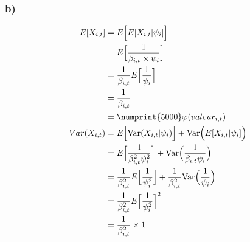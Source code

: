 \documentclass[11pt,french]{report}
\begin{document}
\subsubsection*{b)}
\begin{align*}
E[X_{i,t}] &= E \Big[E[X_{i,t}|\psi_i]  \Big] \\
&= E \Big[\frac{1}{\beta_{i,t} \times \psi_i} \Big] \\
&=\frac{1}{\beta_{i,t}} E \Big[\frac{1}{\psi_i} \Big] \\
&= \frac{1}{\beta_{i,t}}\\
&=\numprint{5000} \varphi(valeur_{i,t})\\                                                                                                                                                                                                     Var(X_{i,t}) &= E \Big[\text{Var}(X_{i,t}|\psi_i) \Big] + \text{Var}\Big( E[X_{i,t}|\psi_i]  \Big) \\
&= E \Big[\frac{1}{\beta_{i,t}^2 \psi_i^2}\Big] + \text{Var}\Big(\frac{1}{\beta_{i,t} \psi_i} \Big) \\
&= \frac{1}{\beta_{i,t}^2} E \Big[\frac{1}{\psi_i^2}\Big] + \frac{1}{\beta_{i,t}^2} \text{Var}\Big(\frac{1}{\psi_i} \Big) \\
&= \frac{1}{\beta_{i,t}^2} E \Big[\frac{1}{\psi_i^2}\Big]^2 \\
&= \frac{1}{\beta_{i,t}^2} \times 1\\
\end{align*}
\end{document}
